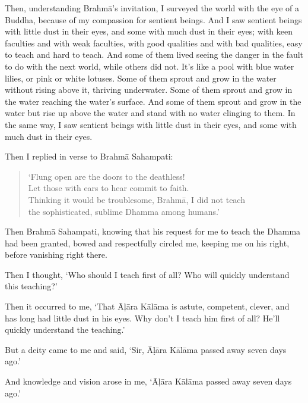\documentclass[12pt,openany]{book}%
\begin{document}
Then, understanding \textsanskrit{Brahmā}’s invitation, I surveyed the world with the eye of a Buddha, because of my compassion for sentient beings. And I saw sentient beings with little dust in their eyes, and some with much dust in their eyes; with keen faculties and with weak faculties, with good qualities and with bad qualities, easy to teach and hard to teach. And some of them lived seeing the danger in the fault to do with the next world, while others did not. It’s like a pool with blue water lilies, or pink or white lotuses. Some of them sprout and grow in the water without rising above it, thriving underwater. Some of them sprout and grow in the water reaching the water’s surface. And some of them sprout and grow in the water but rise up above the water and stand with no water clinging to them. In the same way, I saw sentient beings with little dust in their eyes, and some with much dust in their eyes. 

Then I replied in verse to \textsanskrit{Brahmā} Sahampati: 

\begin{verse}%
‘Flung open are the doors to the deathless! \\
Let those with ears to hear commit to faith. \\
Thinking it would be troublesome, \textsanskrit{Brahmā}, I did not teach \\
the sophisticated, sublime Dhamma among humans.’ 

%
\end{verse}

Then \textsanskrit{Brahmā} Sahampati, knowing that his request for me to teach the Dhamma had been granted, bowed and respectfully circled me, keeping me on his right, before vanishing right there. 

Then I thought, ‘Who should I teach first of all? Who will quickly understand this teaching?’ 

Then it occurred to me, ‘That \textsanskrit{Āḷāra} \textsanskrit{Kālāma} is astute, competent, clever, and has long had little dust in his eyes. Why don’t I teach him first of all? He’ll quickly understand the teaching.’ 

But a deity came to me and said, ‘Sir, \textsanskrit{Āḷāra} \textsanskrit{Kālāma} passed away seven days ago.’ 

And knowledge and vision arose in me, ‘\textsanskrit{Āḷāra} \textsanskrit{Kālāma} passed away seven days ago.’ 
\end{document}
